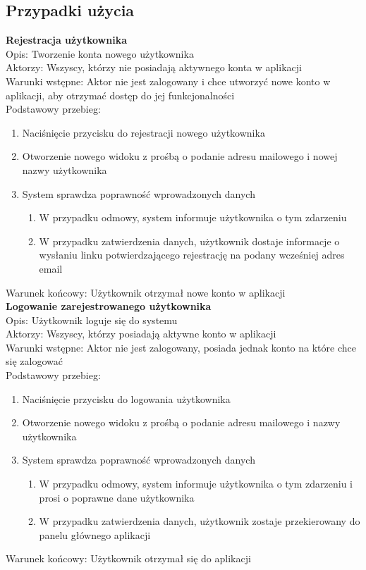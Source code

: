     \subsection{Przypadki użycia}
    \textbf{Rejestracja użytkownika} \\ 
       Opis: Tworzenie konta nowego użytkownika \\
       Aktorzy: Wszyscy, którzy nie posiadają aktywnego konta w aplikacji \\ 
       Warunki wstępne: Aktor nie jest zalogowany i chce utworzyć nowe konto w aplikacji, aby otrzymać dostęp do jej funkcjonalności \\ 
       Podstawowy przebieg:
       \begin{enumerate}
           \item Naciśnięcie przycisku do rejestracji nowego użytkownika
           \item Otworzenie nowego widoku z prośbą o podanie adresu mailowego i nowej nazwy użytkownika
           \item System sprawdza poprawność wprowadzonych danych
           \begin{enumerate}
               \item W przypadku odmowy, system informuje użytkownika o tym zdarzeniu
               \item W przypadku zatwierdzenia danych, użytkownik dostaje informacje o wysłaniu linku potwierdzającego rejestrację na podany wcześniej adres email
           \end{enumerate}
       \end{enumerate}
       Warunek końcowy: Użytkownik otrzymał nowe konto w aplikacji \\

    \textbf{Logowanie zarejestrowanego użytkownika} \\
        Opis: Użytkownik loguje się do systemu \\
        Aktorzy: Wszyscy, którzy posiadają aktywne konto w aplikacji \\ 
        Warunki wstępne: Aktor nie jest zalogowany, posiada jednak konto na które chce się zalogować \\
        Podstawowy przebieg:
        \begin{enumerate}
            \item Naciśnięcie przycisku do logowania użytkownika
            \item Otworzenie nowego widoku z prośbą o podanie adresu mailowego i nazwy użytkownika
            \item System sprawdza poprawność wprowadzonych danych
            \begin{enumerate}
               \item W przypadku odmowy, system informuje użytkownika o tym zdarzeniu i prosi o poprawne dane użytkownika
               \item W przypadku zatwierdzenia danych, użytkownik zostaje przekierowany do panelu głównego aplikacji
           \end{enumerate}
        \end{enumerate}
        Warunek końcowy: Użytkownik otrzymał się do aplikacji \\

